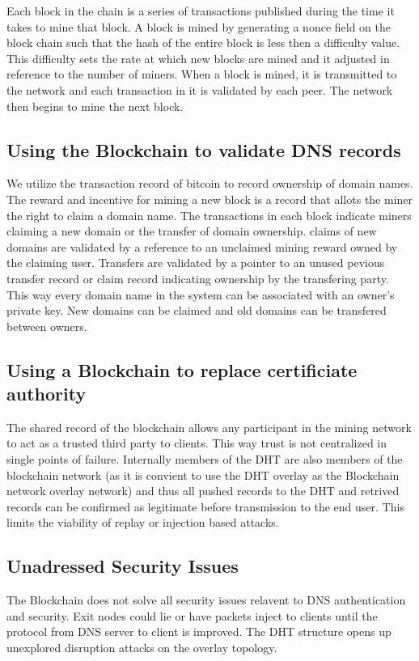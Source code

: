 \documentclass[11pt]{IEEEtran} %
\begin{document}
Each block in the chain is a series of transactions published during the time it takes to mine that block. A block is mined by generating a nonce field on the block chain such that the hash of the entire block is less then a difficulty value. This difficulty sets the rate at which new blocks are mined and it adjusted in reference to the number of miners. When a block is mined, it is transmitted to the network and each transaction in it is validated by each peer. The network then begins to mine the next block.


\subsection{Using the Blockchain to validate DNS records}
We utilize the transaction record of bitcoin to record ownership of domain names. The reward and incentive for mining a new block is a record that allots the miner the right to claim a domain name. The transactions in each block indicate miners claiming a new domain or the transfer of domain ownership. claims of new domains are validated by a reference to an unclaimed mining reward owned by the claiming user. Transfers are validated by a pointer to an unused pevious transfer record or claim record indicating ownership by the transfering party. This way every domain name in the system can be associated with an owner's private key. New domains can be claimed and old domains can be transfered between owners.

\subsection{Using a Blockchain to replace certificiate authority}
The shared record of the blockchain allows any participant in the mining network to act as a trusted third party to clients. This way trust is not centralized in single points of failure. Internally members of the DHT are also members of the blockchain network (as it is convient to use the DHT overlay as the Blockchain network overlay network) and thus all pushed records to the DHT and retrived records can be confirmed as legitimate before transmission to the end user. This limits the viability of replay or injection based attacks.

\subsection{Unadressed Security Issues}
The Blockchain does not solve all security issues relavent to DNS authentication and security. Exit nodes could lie or have packets inject to clients until the protocol from DNS server to client is improved. The DHT structure opens up unexplored disruption attacks on the overlay topology.
\end{document}

